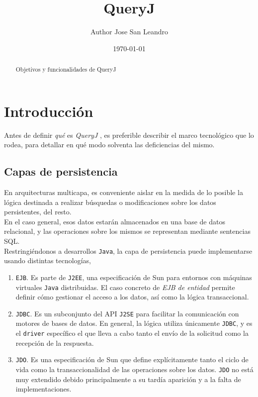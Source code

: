\documentclass[dvips]{article}
\title{QueryJ}
\author{Author Jose San Leandro}
\date{\today}
\begin{document}
\newcommand{\queryj}{\textit{QueryJ} }
\newcommand{\acronim}[1]{\textsf{#1}}
\newcommand{\tech}[1]{\texttt{#1}}
\newcommand{\company}[1]{\textsf{#1}}
\maketitle
\begin{abstract}
Objetivos y funcionalidades de QueryJ
\end{abstract}
\section{Introducci\'on}
Antes de definir \textit{qu\'e} es \queryj, es preferible describir el
marco tecnol\'ogico que lo rodea, para detallar en qu\'e modo solventa
las deficiencias del mismo.
\subsection{Capas de persistencia}
En arquitecturas multicapa, es conveniente aislar en la medida de lo
posible la l\'ogica destinada a realizar b\'usquedas o modificaciones
sobre los datos persistentes, del resto.\\
En el caso general, esos datos estar\'an almacenados en una base de
datos relacional, y las operaciones sobre los mismos se representan
mediante sentencias \acronim{SQL}.\\
Restringi\'endonos a desarrollos \tech{Java}, la capa de persistencia
puede implementarse usando distintas tecnolog\'i{}as,
\begin{enumerate}
\item
  \tech{EJB}. Es parte de \tech{J2EE}, una especificaci\'on de
  \company{Sun} para entornos con m\'aquinas virtuales \tech{Java}
  distribuidas. El caso concreto de \textit{EJB de entidad} permite
  definir c\'omo gestionar el acceso a los datos, as\'i{} como la
  l\'ogica transaccional.
\item
  \tech{JDBC}. Es un subconjunto del API \tech{J2SE} para
  facilitar la comunicaci\'on con motores de bases de datos. En
  general, la l\'ogica utiliza \'unicamente \tech{JDBC}, y es el
  \tech{driver} espec\'i{}fico el que lleva a cabo tanto el env\'i{}o
  de la solicitud como la recepci\'on de la respuesta.
\item
  \tech{JDO}. Es una especificaci\'on de \company{Sun} que define
  expl\'icitamente tanto el ciclo de vida como la transaccionalidad de
  las operaciones sobre los datos. \tech{JDO} no est\'a muy extendido
  debido principalmente a su tard\'i{}a aparici\'on y a la falta de
  implementaciones.
\end{enumerate}
\end{document}
